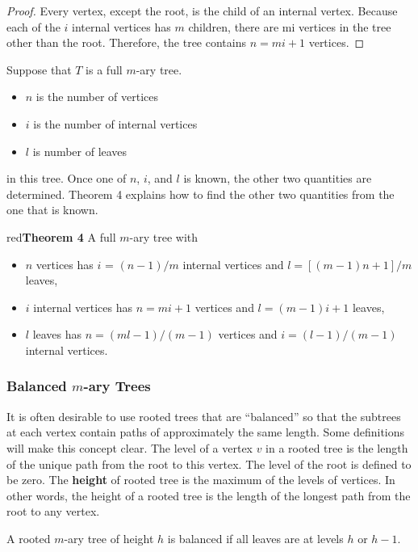 \documentclass{article}
\begin{document}
\begin{proof}
Every vertex, except the root, is the child of an internal vertex. Because each of the $i$ internal vertices has $m$ children, there are mi vertices in the tree other than the root. Therefore, the tree contains $n = mi + 1$ vertices.
\end{proof}


Suppose that $T$ is a full $m$-ary tree.
\begin{itemize}
    \item $n$ is the number of vertices
    \item $i$ is the number of internal vertices
    \item $l$ is number of leaves
\end{itemize}
in this tree. Once one of $n$, $i$, and $l$ is known, the other two quantities are determined. Theorem 4 explains how to find the other two quantities from the one that is known.

\begin{mybox}{red}{\textbf{Theorem 4}}
A full $m$-ary tree with
\begin{itemize}
    \item $n$ vertices has $i$ = $(n - 1)/m$ internal vertices and $l = [(m - 1)n + 1]/m$ leaves,
    \item $i$ internal vertices has $n = mi + 1$ vertices and $l = (m - 1)i + 1$ leaves,
    \item $l$ leaves has $n = (ml - 1)/(m - 1)$ vertices and $i = (l - 1)/(m - 1)$ internal vertices.
\end{itemize}
\end{mybox}

\subsubsection{Balanced $m$-ary Trees}

It is often desirable to use rooted trees that are “balanced” so that the subtrees at each vertex contain paths of approximately the same length. Some definitions will make this concept clear. The level of a vertex $v$ in a rooted tree is the length of the unique path from the root to this vertex. The level of the root is defined to be zero. The \textbf{height} of  rooted tree is the maximum of the levels of vertices. In other words, the height of a rooted tree is the length of the longest path from the root to any vertex.

A rooted $m$-ary tree of height $h$ is balanced if all leaves are at levels $h$ or $h - 1$.
\end{document}
